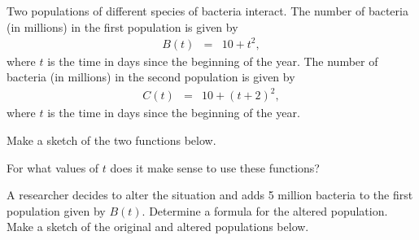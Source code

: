 
\begin{problem}
\item Two populations of different species of bacteria interact. The
  number of bacteria (in millions) in the first population is given by
  \begin{eqnarray*}
    B(t) & = & 10 + t^2,
  \end{eqnarray*}
  where $t$ is the time in days since the beginning of the year.  The
  number of bacteria (in millions) in the second population is given by
  \begin{eqnarray*}
    C(t) & = & 10+(t+2)^2,
  \end{eqnarray*}
  where $t$ is the time in days since the beginning of the year.
  \begin{subproblem}
  \item Make a sketch of the two functions below.
    \vfill
  \item For what values of $t$ does it make sense to use these functions?
    \vfill
  \item A researcher decides to alter the situation and adds 5 million
    bacteria to the first population given by $B(t)$. Determine a
    formula for the altered population. Make a sketch of the original
    and altered populations below.
    \vfill
  \end{subproblem}

\end{problem}



